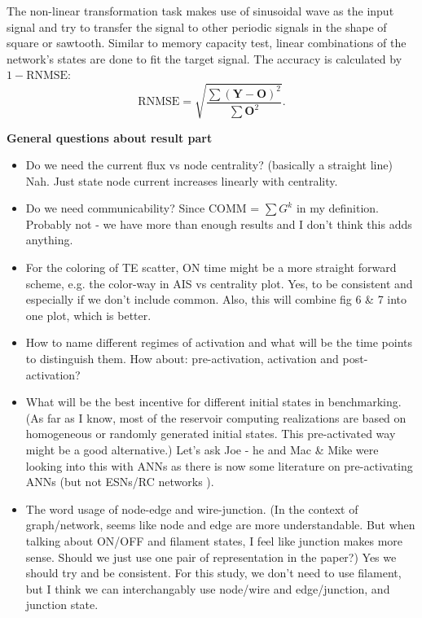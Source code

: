\documentclass[%
 reprint,
 amsmath,amssymb,
 aps,
floatfix,
]{revtex4-2}
\begin{document}
The non-linear transformation task makes use of sinusoidal wave as the input signal and try to transfer the signal to other periodic signals in the shape of square or sawtooth. Similar to memory capacity test, linear combinations of the network's states are done to fit the target signal. The accuracy is calculated by $1 - \text{RNMSE}$:
\begin{equation}
	\text{RNMSE} = \sqrt{\dfrac{\sum (\mathbf Y - \mathbf O)^2}{\sum \mathbf O^2}}.
\end{equation}
\clearpage

\textbf{General questions about result part}

\begin{itemize}
	\item Do we need the current flux vs node centrality? (basically a straight line)
	Nah. Just state node current increases linearly with centrality.
	\item Do we need communicability? Since COMM = $\sum G^k$ in my definition.
	Probably not - we have more than enough results and I don't think this adds anything.
	\item  For the coloring of TE scatter, ON time might be a more straight forward scheme, e.g. the color-way in AIS vs centrality plot.
	Yes, to be consistent and especially if we don't include common. Also, this will combine fig 6 & 7 into one plot, which is better.
	\item How to name different regimes of activation and what will be the time points to distinguish them.
	How about: pre-activation, activation and post-activation?
	\item What will be the best incentive for different initial states in benchmarking. (As far as I know, most of the reservoir computing realizations are based on homogeneous or randomly generated initial states. This pre-activated way might be a good alternative.)
	Let's ask Joe - he and Mac & Mike were looking into this with ANNs as there is now some literature on pre-activating ANNs (but not ESNs/RC networks ).
	\item The word usage of node-edge and wire-junction. (In the context of graph/network, seems like node and edge are more understandable. But when talking about ON/OFF and filament states, I feel like junction makes more sense. Should we just use one pair of representation in the paper?)
	 Yes we should try and be consistent. For this study, we don't need to use filament, but I think we can interchangably use node/wire and edge/junction, and junction state.
\end{itemize}
\end{document}
